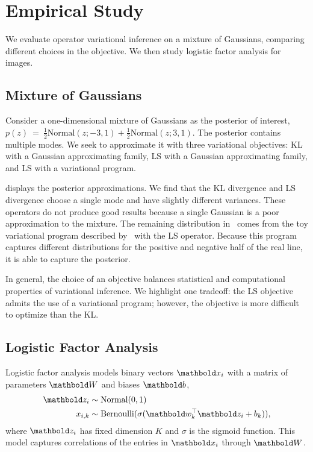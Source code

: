 
\section{Empirical Study}
\label{sec:experiments}
\glsresetall

We evaluate operator variational inference on a mixture of Gaussians,
comparing different choices in the objective. We then study logistic
factor analysis for images.

\subsection{Mixture of Gaussians}
Consider a one-dimensional
mixture of Gaussians as the posterior of interest,
$p(z)~=~\frac{1}{2} \textrm{Normal}(z; -3, 1) + \frac{1}{2}
\textrm{Normal}(z; 3, 1)$.
The posterior contains multiple modes.  We seek to approximate it
with three variational objectives: \gls{KL} with a Gaussian
approximating family, \gls{LS} with a Gaussian approximating family, and \gls{LS}
with a variational program.



 displays the posterior approximations.  We find that the \gls{KL}
divergence and \gls{LS} divergence choose a single mode and have
slightly different variances. These operators do not produce good
results because a single Gaussian is a poor approximation to the
mixture. The remaining distribution in~ comes from the
toy variational program described by~ with the
\gls{LS} operator.  Because this program
captures different distributions for the positive and negative half of the
real line, it is able to capture the posterior.

In general, the choice of an objective balances statistical and computational properties of variational inference. We highlight one tradeoff: the \gls{LS} objective admits the use of a variational program; however, the objective is more difficult to optimize than the \gls{KL}.



\subsection{Logistic Factor Analysis}
Logistic factor analysis models binary vectors $\mbx_i$ with a matrix of
parameters $\mbW$ and biases $\mbb$,
\begin{align*}
  \mbz_i &\sim \textrm{Normal}(0, 1) \\
  x_{i,k} &\sim \textrm{Bernoulli}(\sigma(\mbw_k^\top \mbz_i + b_k)),
\end{align*}
where $\mbz_i$ has fixed dimension $K$ and $\sigma$ is the sigmoid
function.  This model captures correlations of the entries in $\mbx_i$
through $\mbW$.






